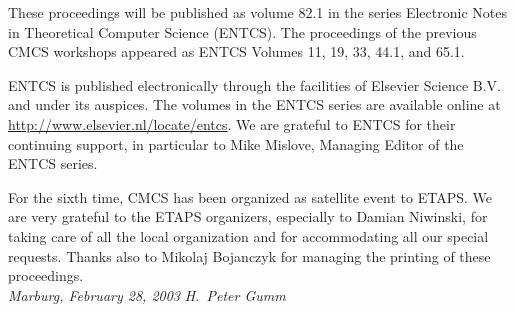 \documentclass{article}
\begin{document}
These proceedings will be published as volume 82.1 in the series
Electronic Notes in Theoretical Computer Science (ENTCS). The
proceedings of the previous CMCS workshops appeared as ENTCS
Volumes 11, 19, 33, 44.1, and 65.1.

ENTCS is published electronically through the facilities of
Elsevier Science B.V. and under its auspices. The volumes in the
ENTCS series are available online at
 \url{http://www.elsevier.nl/locate/entcs}.
We are grateful to ENTCS for their continuing support, in
particular to Mike Mislove, Managing Editor of the ENTCS series.

For the sixth time, CMCS has been organized as satellite event to
ETAPS. We are very grateful to the ETAPS organizers, especially to
Damian Niwinski, for taking care of all the local organization and
for accommodating all our special requests. Thanks also to Mikolaj
Bojanczyk for managing the printing of these proceedings.\\

\noindent \emph{Marburg, February 28, 2003} \hfill \emph{H.~Peter
Gumm}
\end{document}
